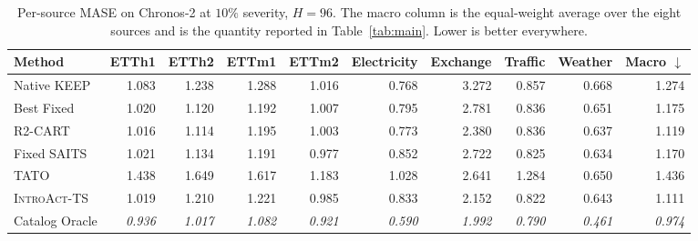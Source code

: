 \documentclass{article}
\newcommand{\oracle}[1]{\textit{\textcolor{phgray}{#1}}}
\newcommand{\introact}{\textsc{IntroAct-TS}}
\begin{document}
\begin{table}[htbp]
  \caption{Per-source MASE on Chronos-2 at $10\%$ severity, $H=96$. The macro column is the
  equal-weight average over the eight sources and is the quantity reported in
  Table~\ref{tab:main}. Lower is better everywhere.}
  \label{tab:app-src-ch2-96}
  \centering
  \small
  \setlength{\tabcolsep}{3pt}
\begin{tabular*}{\textwidth}{@{\extracolsep{\fill}}lrrrrrrrrr@{}}
    \toprule
    Method & ETTh1 & ETTh2 & ETTm1 & ETTm2 & Electricity & Exchange & Traffic & Weather & Macro $\downarrow$ \\
    \midrule
    Native KEEP & 1.083 & 1.238 & 1.288 & 1.016 & 0.768 & 3.272 & 0.857 & 0.668 & 1.274 \\
    Best Fixed & 1.020 & 1.120 & 1.192 & 1.007 & 0.795 & 2.781 & 0.836 & 0.651 & 1.175 \\
    R2-CART & 1.016 & 1.114 & 1.195 & 1.003 & 0.773 & 2.380 & 0.836 & 0.637 & 1.119 \\
    Fixed SAITS & 1.021 & 1.134 & 1.191 & 0.977 & 0.852 & 2.722 & 0.825 & 0.634 & 1.170 \\
    TATO & 1.438 & 1.649 & 1.617 & 1.183 & 1.028 & 2.641 & 1.284 & 0.650 & 1.436 \\
    \midrule
    \rowcolor{bestgray}\introact{} & 1.019 & 1.210 & 1.221 & 0.985 & 0.833 & 2.152 & 0.822 & 0.643 & 1.111 \\
    \midrule
    Catalog Oracle & \oracle{0.936} & \oracle{1.017} & \oracle{1.082} & \oracle{0.921} & \oracle{0.590} & \oracle{1.992} & \oracle{0.790} & \oracle{0.461} & \oracle{0.974} \\
    \bottomrule
  \end{tabular*}
\end{table}
\end{document}
